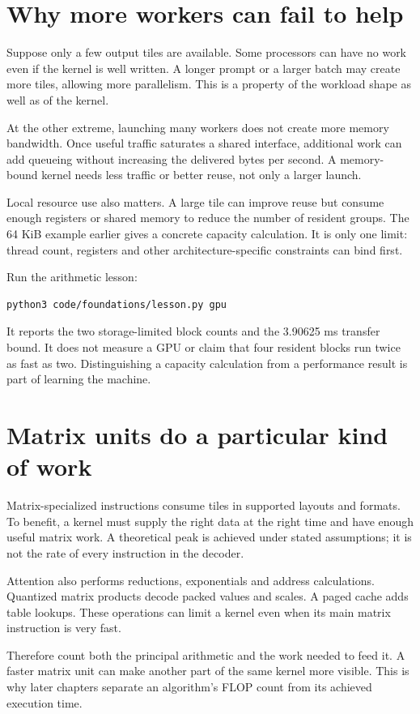 \section{Why more workers can fail to help}
Suppose only a few output tiles are available. Some processors can
have no work even if the kernel is well written. A longer prompt or
a larger batch may create more tiles, allowing more parallelism.
This is a property of the workload shape as well as of the kernel.

At the other extreme, launching many workers does not create more
memory bandwidth. Once useful traffic saturates a shared interface,
additional work can add queueing without increasing the delivered
bytes per second. A memory-bound kernel needs less traffic or better
reuse, not only a larger launch.

Local resource use also matters. A large tile can improve reuse but
consume enough registers or shared memory to reduce the number of
resident groups. The 64 KiB example earlier gives a concrete capacity
calculation. It is only one limit: thread count, registers and other
architecture-specific constraints can bind first.

Run the arithmetic lesson:
\begin{verbatim}
python3 code/foundations/lesson.py gpu
\end{verbatim}
It reports the two storage-limited block counts and the 3.90625 ms
transfer bound. It does not measure a GPU or claim that four resident
blocks run twice as fast as two. Distinguishing a capacity calculation
from a performance result is part of learning the machine.

\section{Matrix units do a particular kind of work}
Matrix-specialized instructions consume tiles in supported layouts and
formats. To benefit, a kernel must supply the right data at the right
time and have enough useful matrix work. A theoretical peak is achieved
under stated assumptions; it is not the rate of every instruction in
the decoder.

Attention also performs reductions, exponentials and address
calculations. Quantized matrix products decode packed values and scales.
A paged cache adds table lookups. These operations can limit a kernel
even when its main matrix instruction is very fast.

Therefore count both the principal arithmetic and the work needed to
feed it. A faster matrix unit can make another part of the same kernel
more visible. This is why later chapters separate an algorithm's FLOP
count from its achieved execution time.

